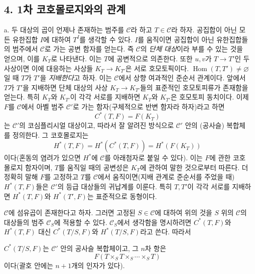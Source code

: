 \subsection*{4. 1차 코호몰로지와의 관계}

\medskip\noindent
a. 두 대상의 곱이 언제나 존재하는 범주를 $\mathcal C$라 하고
$T\in\mathcal C$라 하자. 공집합이 아닌 모든 유한집합 $I$에 대하여
$T^I$를 생각할 수 있다. $I$를 움직이면 공집합이 아닌 유한집합들의
범주에서 $\mathcal C$로 가는 공변 함자를 얻는다. 즉 $\mathcal C$의
\emph{단체 대상}이라 부를 수 있는 것을 얻으며, 이를 $K_T$로 나타낸다.
이는 $T$에 공변적으로 의존한다. 또한 $u,v$가 $T\longrightarrow T'$인 두
사상이면 이에 대응하는 사상들 $K_T\longrightarrow K_{T'}$은 서로
호모토픽이다. $\operatorname{Hom}(T,T')\ne\varnothing$일 때 $T$가 $T'$을
\emph{지배한다}고 하자. 이는 $\mathcal C$에서 상향 여과적인 준순서
관계이다. 앞에서 $T$가 $T'$을 지배하면 단체 대상의 사상
$K_T\longrightarrow K_{T'}$들의 표준적인 호모토피류가 존재함을 얻는다.
특히 $K_T$와 $K_{T'}$이 각각 서로를 지배하면 $K_T$와 $K_{T'}$은
호모토피 동치이다. 이제 $F$를 $\mathcal C$에서 아벨 범주
$\mathcal C'$로 가는 함자(구체적으로 반변 함자라 하자)라고 하면
\[
  C^*(T,F)=F(K_T)
\]
는 $\mathcal C'$의 코심플리시얼 대상이고, 따라서 잘 알려진 방식으로
$\mathcal C'$ 안의 (공사슬) 복합체를 정의한다. 그 코호몰로지는
\[
  H^*(T,F)=H^*(C^*(T,F))=H^*(F(K_T))
\]
이다(혼동의 염려가 있으면 $H^*$에 $\mathcal C$를 아래첨자로 붙일 수
있다). 이는 $F$에 관한 코호몰로지 함자이며, $T$를 움직일 때의 공변성은
$K_T$에 관하여 말한 것으로부터 따른다. 더 정확히 말해 $F$를 고정하고
$T$를 $\mathcal C$에서 움직이면(지배 관계로 준순서를 주었을 때)
$H^*(T,F)$들은 $\mathcal C'$의 등급 대상들의 귀납계를 이룬다. 특히
$T,T'$이 각각 서로를 지배하면 $H^*(T,F)$와 $H^*(T',F)$는 표준적으로
동형이다.

$\mathcal C$에 섬유곱이 존재한다고 하자. 그러면 고정된
$S\in\mathcal C$에 대하여 위의 것을 $S$ 위의 $\mathcal C$의 대상들의
범주 $\mathcal C_S$에 적용할 수 있다. $\mathcal C_S$에서 생각함을
명시하려면 $C^*(T,F)$와 $H^*(T,F)$ 대신 $C^*(T/S,F)$와
$H^*(T/S,F)$라고 쓴다. 따라서

$C^*(T/S,F)$는 $\mathcal C'$ 안의 공사슬 복합체이고, 그 $n$차 항은
\[
  F(T\times_ST\times_S\cdots\times_ST)
\]
이다(괄호 안에는 $n+1$개의 인자가 있다).

